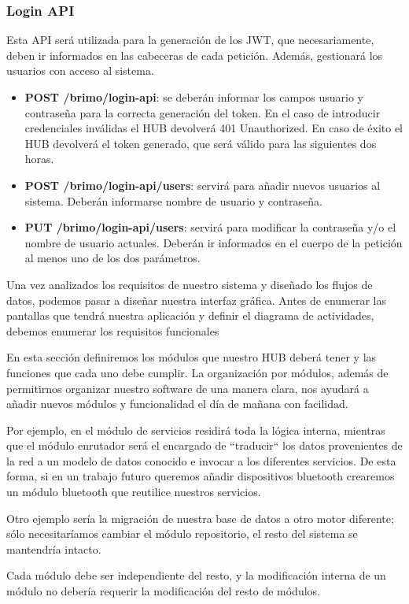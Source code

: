 \subsubsection{Login API}
Esta API será utilizada para la generación de los JWT, que necesariamente, deben ir informados en las cabeceras de cada petición. Además, gestionará
los usuarios con acceso al sistema.
\begin{itemize}
\setlength\itemsep{6pt plus 1pt minus 1pt}
\item \textbf{POST /brimo/login-api}: se deberán informar los campos usuario y contraseña para la correcta generación del token. En el caso
de introducir credenciales inválidas el HUB devolverá 401 Unauthorized. En caso de éxito el HUB devolverá el token generado, que será válido
para las siguientes dos horas.
\item \textbf{POST /brimo/login-api/users}: servirá para añadir nuevos usuarios al sistema. Deberán informarse nombre de usuario y contraseña.
\item \textbf{PUT /brimo/login-api/users}: servirá para modificar la contraseña y/o el nombre de usuario actuales. Deberán ir informados en el
cuerpo de la petición al menos uno de los dos parámetros.
\end{itemize}


Una vez analizados los requisitos de nuestro sistema y diseñado los flujos de datos, podemos pasar a diseñar nuestra interfaz gráfica. Antes de
enumerar las pantallas que tendrá nuestra aplicación y definir el diagrama de actividades, debemos enumerar los requisitos funcionales 

En esta sección definiremos los módulos que nuestro HUB deberá tener y las funciones que cada uno debe cumplir. La organización por módulos, además
de permitirnos organizar nuestro software de una manera clara, nos ayudará a añadir nuevos módulos y funcionalidad el día de mañana con facilidad.
\par
Por ejemplo, en el módulo de servicios residirá toda la lógica interna, mientras que el módulo enrutador será el encargado de ``traducir`` los datos
provenientes de la red a un modelo de datos conocido e invocar a los diferentes servicios. De esta forma, si en un trabajo futuro queremos añadir
dispositivos bluetooth crearemos un módulo bluetooth que reutilice nuestros servicios.
\par
Otro ejemplo sería la migración de nuestra base de datos a otro motor diferente; sólo necesitaríamos cambiar el módulo repositorio, el resto del sistema
se mantendría intacto.
\par
Cada módulo
debe ser independiente del resto, y la modificación interna de un módulo no debería requerir la modificación del resto de módulos.
